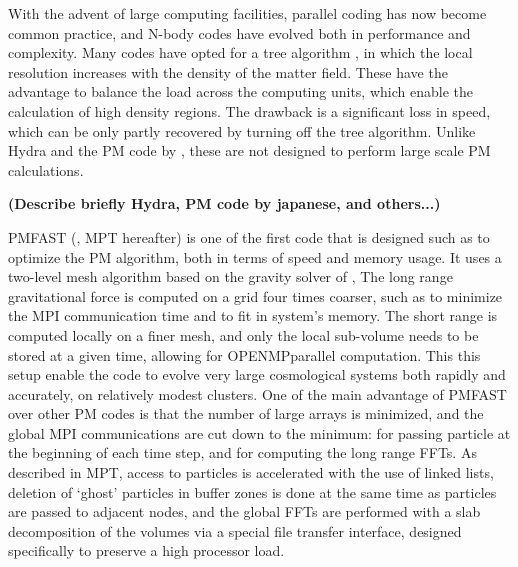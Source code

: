With the advent of large computing facilities, parallel coding has now become common practice, 
and N-body codes have evolved both in performance and complexity. 
Many codes have opted for a tree algorithm \citep{Gadjet, Gadjet2, TPM, GOTPM}, in which 
the local resolution increases with the density of the matter field. 
These have the advantage to balance the load across the computing units, which enable the calculation of high density regions. 
The drawback is a significant loss in speed, which can be only partly recovered by turning off the tree algorithm. 
Unlike Hydra \citep{couchman1991} and the PM code by \cite{FerrelBertschinger1995},
 these are not designed to perform large scale PM calculations. 

{\bf (Describe briefly   Hydra, PM code by japanese, and others...)}


{\small PMFAST} (\cite{PMFAST}, MPT hereafter) is one of the first code that is designed such as to optimize the PM algorithm,
both in terms of speed and memory usage. It uses a two-level mesh algorithm based on the gravity solver of \cite{TracPen2003},
The long range gravitational force is computed on a  grid four times coarser, such as to minimize the {\small MPI} communication time
and to fit in system's memory. The short range is computed locally on a finer mesh, and only the local sub-volume needs 
to be stored at a given time, allowing for {\small OPENMP}parallel computation.
This this setup enable the code to evolve very large cosmological systems both rapidly and accurately, on relatively modest clusters.
One of the main advantage of {\small PMFAST} over other PM codes is that the number of large arrays is minimized,
and the global {\small MPI} communications are cut down to the minimum: for passing particle at the beginning of each time step,
and  for computing the long range FFTs.
As described in MPT, access to particles is accelerated with the use of linked lists, deletion of `ghost' particles
in buffer zones is done at the same time as particles are passed to adjacent nodes,
and the global FFTs are performed with a slab decomposition of the volumes via a special file transfer interface, 
designed specifically to preserve a high processor load.

